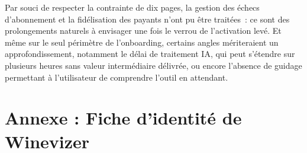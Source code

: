\documentclass[12pt, a4paper]{article}
\newcounter{annexe}
\begin{document}
Par souci de respecter la contrainte de dix pages, la gestion des échecs d'abonnement et
la fidélisation des payants n'ont pu être traitées~: ce sont des prolongements naturels à
envisager une fois le verrou de l'activation levé. Et même sur le seul périmètre de
l'onboarding, certains angles mériteraient un approfondissement, notamment le délai de
traitement IA, qui peut s'étendre sur plusieurs heures sans valeur intermédiaire délivrée,
ou encore l'absence de guidage permettant à l'utilisateur de comprendre l'outil en attendant.

\newpage
\appendix
\pagestyle{empty}
{}\label{annexe:identite}
\section*{Annexe \theannexe : Fiche d'identité de Winevizer}
\end{document}
